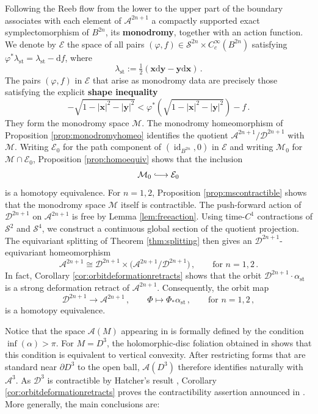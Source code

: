 \documentclass{amsart}
\theoremstyle{definition}
\newcommand{\AAA}{\mathcal A}
\newcommand{\rmd}{\mathrm d}
\newcommand{\DD}{\mathcal D}
\newcommand{\EE}{\mathcal E}
\newcommand{\MM}{\mathcal M}
\renewcommand{\SS}{\mathcal S}
\newcommand{\bfx}{\mathbf x}
\newcommand{\bfy}{\mathbf y}
\newcommand{\lra}{\longrightarrow}
\DeclareMathOperator{\id}{\mathrm{id}}
\DeclareMathOperator{\st}{\mathrm{st}}
\begin{document}
Following the Reeb flow
from the lower to the upper part of the boundary
associates with each element of $\AAA^{2n+1}$
a compactly supported exact symplectomorphism
of $B^{2n}$,
its {\bf monodromy},
together with an action function.
We denote by $\EE$ the space of all pairs
$(\varphi,f)\in\SS^{2n}\times C_c^{\infty}(B^{2n})$
satisfying
$\varphi^*\lambda_{\st}=\lambda_{\st}-\rmd f$,
where 
\[
\lambda_{\st}:=\tfrac12(\bfx\rmd\bfy-\bfy\rmd\bfx)
\,.
\]
The pairs $(\varphi,f)$ in $\EE$
that arise as monodromy data
are precisely those satisfying
the explicit {\bf shape inequality}
\[
-\sqrt{1-|\bfx|^2-|\bfy|^2}
<
\varphi^*\!\left(
\sqrt{1-|\bfx|^2-|\bfy|^2}
\right)-f
\,.
\]
They form the monodromy space $\MM$.
The monodromy homeomorphism
of Proposition \ref{prop:monodromyhomeo}
identifies the quotient
$\AAA^{2n+1}/\DD^{2n+1}$
with $\MM$.
Writing $\EE_0$ for the path component
of $(\id_{B^{2n}},0)$ in $\EE$
and writing $\MM_0$ for $\MM\cap\EE_0$,
Proposition \ref{prop:homoequiv}
shows that the inclusion
\[
\MM_0\lhook\joinrel\longrightarrow\EE_0
\]
is a homotopy equivalence.
For $n=1,2$,
Proposition \ref{prop:mscontractible} shows
that the monodromy space $\MM$ itself is contractible.
The push-forward action of $\DD^{2n+1}$
on $\AAA^{2n+1}$ is free
by Lemma \ref{lem:freeaction}.
Using time-$C^1$ contractions
of $\SS^2$ and $\SS^4$,
we construct a continuous global section
of the quotient projection.
The equivariant splitting
of Theorem \ref{thm:splitting} then gives
an $\DD^{2n+1}$-equivariant homeomorphism
\[
\AAA^{2n+1}
\cong
\DD^{2n+1}\times
\big(
\AAA^{2n+1}/\DD^{2n+1}
\big)
\,,
\qquad
\text{for } n=1,2
\,.
\]
In fact,
Corollary \ref{cor:orbitdeformationretracts}
shows that the orbit
$\DD^{2n+1}\cdot\alpha_{\st}$
is a strong deformation retract
of $\AAA^{2n+1}$.
Consequently,
the orbit map
\[
\DD^{2n+1}\lra\AAA^{2n+1}
\,,
\qquad
\Phi\longmapsto\Phi_*\alpha_{\st}
\,,
\qquad
\text{for } n=1,2
\,,
\]
is a homotopy equivalence.

Notice that the space $\mathcal A(M)$
appearing in \cite[p.\ 1305, Item~1.c)]{eh94}
is formally defined by the condition
$\inf(\alpha)>\pi$.
For $M=D^3$,
the holomorphic-disc foliation obtained in \cite{eh94}
shows that this condition
is equivalent to vertical convexity.
After restricting forms that are standard
near $\partial D^3$ to the open ball,
$\mathcal A(D^3)$ therefore identifies naturally
with $\AAA^3$.
As $\DD^3$ is contractible
by Hatcher's result \cite{hat83},
Corollary \ref{cor:orbitdeformationretracts}
proves the contractibility assertion
announced in
\cite[p.\ 1305, Item~1.c)]{eh94}.
More generally,
the main conclusions are:
\end{document}
